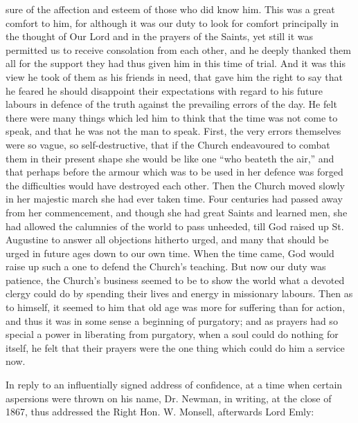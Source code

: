 sure of the affection and esteem of those who did know him. This was a
great comfort to him, for although it was our duty to look for comfort
principally in the thought of Our Lord and in the prayers of the
Saints, yet still it was permitted us to receive consolation from each
other, and he deeply thanked them all for the support they had thus
given him in this time of trial. And it was this view he took of them
as his friends in need, that gave him the right to say that he feared
he should disappoint their expectations with regard to his future
labours in defence of the truth against the prevailing errors of the
day. He felt there were many things which led him to think that the
time was not come to speak, and that he was not the man to speak.
First, the very errors themselves were so vague, so self-destructive,
that if the Church endeavoured to combat them in their present shape
she would be like one ``who beateth the air,'' and that perhaps before
the armour which was to be used in her defence was forged the
difficulties would have destroyed each other. Then the Church moved
slowly in her majestic march she had ever taken time. Four centuries
had passed away from her commencement, and though she had great Saints
and learned men, she had allowed the calumnies of the world to pass
unheeded, till God raised up St. Augustine to answer all objections
hitherto urged, and many that should be urged in future ages down to
our own time. When the time came, God would raise up such a one to
defend the Church's teaching. But now our duty was patience, the
Church's business seemed to be to show the world what a devoted clergy
could do by spending their lives and energy in missionary labours.
Then as to himself, it seemed to him that old age was more for
suffering than for action, and thus it was in some sense a beginning
of purgatory; and as prayers had so special a power in liberating from
purgatory, when a soul could do nothing for itself, he felt that their
prayers were the one thing which could do him a service now.


In reply to an influentially signed address of
confidence, at a time when certain aspersions were thrown on his name,
Dr. Newman, in writing, at the close of 1867, thus addressed the Right
Hon. W. Monsell, afterwards Lord Emly:

